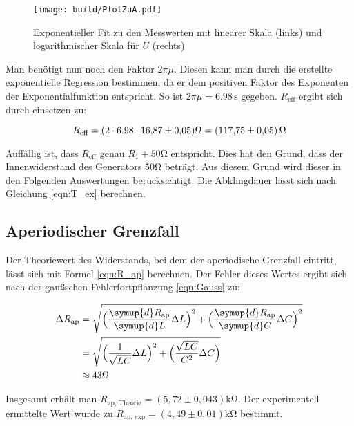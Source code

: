\begin{figure}
  \centering
  \texttt{[image: build/PlotZuA.pdf]}
  \caption{Exponentieller Fit \cite{scipy} zu den Messwerten mit linearer Skala (links) und logarithmischer Skala für $U$ (rechts)}
  \label{fig:PlotZuA}
\end{figure}

Man benötigt nun noch den Faktor $2\pi\mu$. Diesen kann man durch die erstellte exponentielle Regression 
bestimmen, da er dem positiven Faktor des Exponenten der Exponentialfunktion entspricht. 
So ist $2\pi\mu = 6.98\,\unit{\second}$ gegeben.
$R_{\text{eff}}$ ergibt sich durch einsetzen zu:

\begin{equation*}
  R_{\text{eff}} = (2\cdot 6.98\cdot \num{16.87\pm 0.05}) \unit{\ohm} = (\num{117.75 \pm 0.05})\,\unit{\ohm}
\end{equation*}

Auffällig ist, dass $R_{\text{eff}}$ genau $R_1 + 50\unit{\ohm}$ entspricht. Dies hat den Grund, dass der Innenwiderstand des Generators
$50 \unit{\ohm}$ beträgt. Aus diesem Grund wird dieser in den Folgenden Auswertungen berücksichtigt.
Die Abklingdauer lässt sich nach Gleichung \eqref{eqn:T_ex} berechnen.

\subsection{Aperiodischer Grenzfall}
\label{subsec:AuswertungB}

Der Theoriewert des Widerstands, bei dem der aperiodische Grenzfall eintritt, lässt sich mit Formel \eqref{eqn:R_ap} berechnen.
Der Fehler dieses Wertes ergibt sich nach der gaußschen Fehlerfortpflanzung \eqref{eqn:Gauss} zu:

\begin{align*}
  \label{eqn:err_R_ap}
  \Delta R_{\text{ap}} &= \sqrt{\Bigl(\frac{\symup{d}R_{\text{ap}}}{\symup{d}L}\Delta L \Bigr)^2+\Bigl(\frac{\symup{d}R_{\text{ap}}}{\symup{d}C}\Delta C\Bigr)^2} \\
  &= \sqrt{\Bigl(\frac{1}{\sqrt{LC}}\Delta L\Bigr)^2+\Bigl(\frac{\sqrt{LC}}{C^2}\Delta C\Bigr)} \\
  &\approx 43 \unit{\ohm}
\end{align*}

Insgesamt erhält man $R_{\text{ap, Theorie}} = (5,72 \pm 0,043) \unit{\kilo\ohm}$. Der experimentell ermittelte Wert wurde 
zu $R_{\text{ap, exp}} = (4,49 \pm 0,01) \unit{\kilo\ohm}$ bestimmt.


